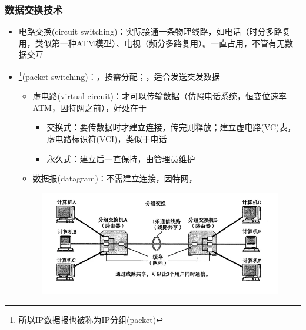 \subsubsection{数据交换技术}
\begin{itemize}
\item 电路交换(circuit switching)：实际接通一条物理线路，如电话（时分多路复用，类似第一种ATM模型）、电视（频分多路复用）。一直占用，不管有无数据交互
\item {}\footnote{所以IP数据报也被称为IP分组(packet)}(packet switching)：，按需分配；，适合发送突发数据
\begin{itemize}
	\item 虚电路(virtual circuit)：才可以传输数据（仿照电话系统，恒变位速率ATM，因特网之前），好处在于
	\begin{itemize}
	    \item 交换式：要传数据时才建立连接，传完则释放；建立虚电路(VC)表，虚电路标识符(VCI)，类似于电话
	    \item 永久式：建立后一直保持，由管理员维护
	\end{itemize}
	\item 数据报(datagram)：不需建立连接，因特网，
\end{itemize}
\begin{figure}[H]
	\centering
	\includegraphics[width=0.6\linewidth]{fig/ip-packet.png}
\end{figure}
\end{itemize}

